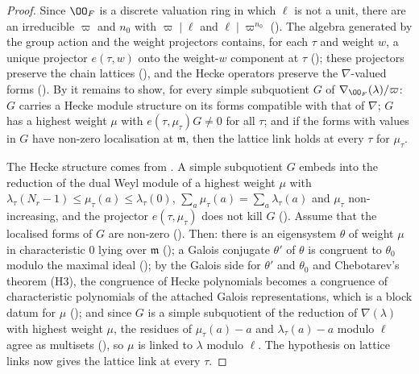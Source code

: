 \begin{proof}
Since $\OO_F$ is a discrete valuation ring in which $\ell$ is not a unit, there are an irreducible $\varpi$ and $n_0$ with $\varpi\mid\ell$
and $\ell\mid\varpi^{n_0}$ (). The algebra generated by the group action and the weight
projectors contains, for each $\tau$ and weight $w$, a unique projector $e(\tau,w)$ onto the weight-$w$ component at $\tau$
(); these projectors preserve the chain lattices
(), and the Hecke operators preserve the $\nabla$-valued forms
(). By  it
remains to show, for every simple subquotient $G$ of $\nabla_{\OO_F}(\lambda)/\varpi$: $G$ carries a Hecke module structure on its forms
compatible with that of $\nabla$; $G$ has a highest weight $\mu$ with $e(\tau,\mu_\tau)G\ne0$ for all $\tau$; and if the forms with
values in $G$ have non-zero localisation at $\mathfrak m$, then the lattice link holds at every $\tau$ for $\mu_\tau$.

The Hecke structure comes from . A simple subquotient $G$ embeds into the reduction of
the dual Weyl module of a highest weight $\mu$ with $\lambda_\tau(N_r-1)\le\mu_\tau(a)\le\lambda_\tau(0)$, $\sum_a\mu_\tau(a)=\sum_a\lambda_\tau(a)$
and $\mu_\tau$ non-increasing, and the projector $e(\tau,\mu_\tau)$ does not kill $G$
(). Assume that the localised forms of $G$ are non-zero
(). Then: there is an eigensystem $\theta$ of weight $\mu$ in
characteristic $0$ lying over $\mathfrak m$ (); a Galois
conjugate $\theta'$ of $\theta$ is congruent to $\theta_0$ modulo the maximal ideal
(); by the Galois side for $\theta'$ and $\theta_0$ and Chebotarev's theorem
(H3), the congruence of Hecke polynomials becomes a congruence of characteristic polynomials of the attached Galois representations,
which is a block datum for $\mu$ (); and since $G$ is a simple subquotient of
the reduction of $\nabla(\lambda)$ with highest weight $\mu$, the residues of $\mu_\tau(a)-a$ and $\lambda_\tau(a)-a$ modulo $\ell$ agree as
multisets (), so $\mu$ is linked to $\lambda$ modulo $\ell$. The
hypothesis on lattice links now gives the lattice link at every $\tau$.
\end{proof}

